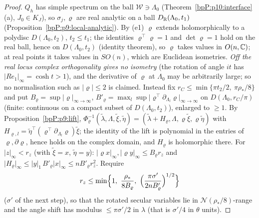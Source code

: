 \begin{proof}
\label{stepP:p11:hc-rot} $Q_h$ has simple spectrum on the ball $\mathcal W\ni\Lambda_0$ (Theorem~\ref{bpP:p10:interface}(a), $J_0\in K_J$), so $\sigma_j,\varrho$ are real analytic on a ball $D_{\mathbb{R}}(\Lambda_0,t_1)$ (Proposition~\ref{bpP:p9:local-analytic}). By (e1) $\varrho$ extends holomorphically to a polydisc $D(\Lambda_0,t_2)$, $t_2\le t_1$; the identities $\varrho^\top\varrho=1$ and $\det\varrho=1$ hold on the real ball, hence on $D(\Lambda_0,t_2)$ (identity theorem), so $\varrho$ takes values in $O(n,\mathbb{C})$; at real points it takes values in $SO(n)$, which are Euclidean isometries. \emph{Off the real locus complex orthogonality gives no isometry} (the rotation of angle $it$ has $\lvert Re_1\rvert_\infty=\cosh t>1$), and the derivative of $\varrho$ at $\Lambda_0$ may be arbitrarily large; so no normalisation such as $\lvert\varrho\rvert\le2$ is claimed. Instead fix $r_C\le\min\{\pi t_2/2,\ \pi\rho_*/8\}$ and put $B_\varrho=\sup\lvert\varrho\rvert_{\infty\to\infty}$, $B'_\varrho=\max_l\sup\lvert\varrho^\top\partial_{\Lambda_l}\varrho\rvert_{\infty\to\infty}$ on $D(\Lambda_0,r_C/\pi)$ (finite: continuous on a compact subset of $D(\Lambda_0,t_2)$), enlarged to $\ge1$.
\label{stepP:p11:hc-lift} By Proposition~\ref{bpP:p9:lift}, $\Phi_\varrho^{-1}(\tilde\lambda,\Lambda,\tilde\xi,\tilde\eta)=(\tilde\lambda+H_\varrho,\Lambda,\varrho\tilde\xi,\varrho\tilde\eta)$ with $H_{\varrho,l}=\tilde\eta^\top(\varrho^\top\partial_{\Lambda_l}\varrho)\tilde\xi$; the identity of the lift is polynomial in the entries of $\varrho,\partial\varrho$, hence holds on the complex domain, and $H_\varrho$ is holomorphic there. For $\lvert z\rvert_\infty<r_z$ (with $\tilde\xi=x$, $\tilde\eta=y$): $\lvert\varrho x\rvert_\infty,\lvert\varrho y\rvert_\infty\le B_\varrho r_z$ and $\lvert H_\varrho\rvert_\infty\le\lvert y\rvert_1\,B'_\varrho\lvert x\rvert_\infty\le nB'_\varrho r_z^2$. Require
\[r_z\le\min\Bigl\{1,\ \frac{\rho_*}{8B_\varrho},\ \Bigl(\frac{\pi\sigma'}{2nB'_\varrho}\Bigr)^{1/2}\Bigr\}\]
($\sigma'$ of the next step), so that the rotated secular variables lie in $\mathcal N(\rho_*/8)$-range and the angle shift has modulus $\le\pi\sigma'/2$ in $\lambda$ (that is $\sigma'/4$ in $\theta$ units).

\end{proof}

